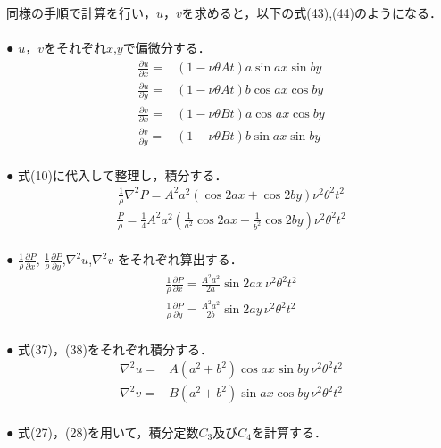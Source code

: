 \documentclass[12pt,a4paper]{jsarticle}
\begin{document}
同様の手順で計算を行い，$u$，$v$を求めると，以下の式(43),(44)のようになる．\\ \\
● $u$，$v$をそれぞれ$x$,$y$で偏微分する．
\begin{eqnarray}
    \frac{\partial u}{\partial x}
    =&
    \left(
    1-\nu \theta A t
    \right)
    a \sin{ax} \sin{by}
    \\
    \frac{\partial u}{\partial y}
    =&
    \left(
    1-\nu \theta A t
    \right)
    b \cos{ax} \cos{by}
    \\
    \frac{\partial v}{\partial x}
    =&
    \left(
    1-\nu \theta B t
    \right)
    a \cos{ax} \cos{by}
    \\
    \frac{\partial v}{\partial y}
    =&
    \left(
    1-\nu \theta B t
    \right)
    b \sin{ax} \sin{by}
\end{eqnarray}
\\
● 式(10)に代入して整理し，積分する．
\begin{eqnarray}
    \frac{1}{\rho} \nabla^2P
    =
    A^2a^2
    \left(
    \cos{2ax}
    +
    \cos {2by}
    \right)
    \nu^2 \theta^2 t^2
\end{eqnarray}
\begin{eqnarray}
    \frac{P}{\rho}
    =
    \frac{1}{4}A^2a^2
    \left(
    \frac{1}{a^2} \cos{2ax}
    +
    \frac{1}{b^2} \cos{2by}
    \right)
    \nu^2 \theta^2 t^2
\end{eqnarray}
\\
●  $\frac{1}{\rho}\frac{\partial P}{\partial x}$,
$\frac{1}{\rho}\frac{\partial P}{\partial y}$,$ \nabla^2u$,$\nabla^2v$
をそれぞれ算出する．
\begin{eqnarray}
    \frac{1}{\rho}
    \frac{\partial P}{\partial x}
    =
    \frac{A^2a^2}{2a}\sin {2ax}
    \,\nu^2 \theta^2 t^2
    \\
    \frac{1}{\rho}
    \frac{\partial P}{\partial y}
    =
    \frac{A^2a^2}{2b}\sin {2ay}
    \,\nu^2 \theta^2 t^2
\end{eqnarray}
\\
● 式(37)，(38)をそれぞれ積分する．
\begin{eqnarray}
    \nabla^2u
    =&
    A
    \left(
    a^2+b^2
    \right)
    \cos{ax}\sin{by}
    \,\nu^2 \theta^2 t^2
    \\
    \nabla^2v
    =&
    B
    \left(
    a^2+b^2
    \right)
    \sin{ax}\cos{by}
    \,\nu^2 \theta^2 t^2
\end{eqnarray}\\
● 式(27)，(28)を用いて，積分定数$C_3$及び$C_4$を計算する．
\end{document}
